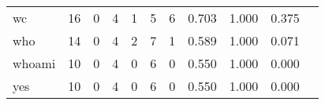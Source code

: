 \begin{longtable}{lp{1.2cm}p{1.2cm}p{1.2cm}p{1.2cm}p{1.2cm}p{1.2cm}p{1.2cm}p{1.2cm}p{1.2cm}p{1.2cm}}
wc        &                                    16 &                                                  0 &                                                  4 &                                                  1 &                                                  5 &                                                  6 &                                              0.703 &                                              1.000 &                                              0.375 \\
who       &                                    14 &                                                  0 &                                                  4 &                                                  2 &                                                  7 &                                                  1 &                                              0.589 &                                              1.000 &                                              0.071 \\
whoami    &                                    10 &                                                  0 &                                                  4 &                                                  0 &                                                  6 &                                                  0 &                                              0.550 &                                              1.000 &                                              0.000 \\
yes       &                                    10 &                                                  0 &                                                  4 &                                                  0 &                                                  6 &                                                  0 &                                              0.550 &                                              1.000 &                                              0.000 \\
\end{longtable}
